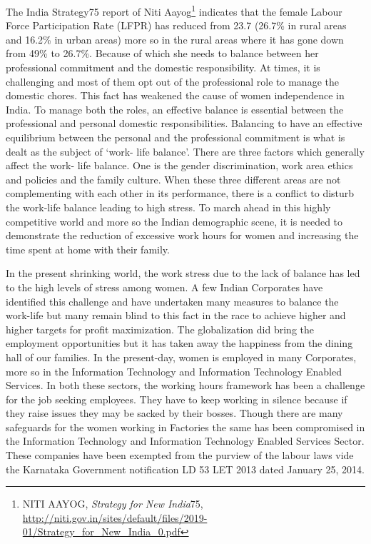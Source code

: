 \begin{multicols}{2}

\noi
The India Strategy\@75 report of Niti Aayog\footnote{NITI AAYOG, \textit{Strategy for New India}\@75, \url{http://niti.gov.in/sites/default/files/2019- 01/Strategy_for_New_India_0.pdf}} indicates that the female Labour Force
Participation Rate (LFPR) has reduced from 23.7 (26.7\% in rural areas and 16.2\% in urban areas) more so in the rural areas where it has gone down from 49\% to 26.7\%. Because of which she needs to balance between her professional commitment and the domestic
responsibility. At times, it is challenging and most of them opt out of the professional role to
manage the domestic chores. This fact has weakened the cause of women independence in
India. To manage both the roles, an effective balance is essential between the professional
and personal domestic responsibilities. Balancing to have an effective equilibrium between
the personal and the professional commitment is what is dealt as the subject of ‘work- life
balance’. There are three factors which generally affect the work- life balance. One is the
gender discrimination, work area ethics and policies and the family culture. When these three
different areas are not complementing with each other in its performance, there is a conflict to
disturb the work-life balance leading to high stress. To march ahead in this highly
competitive world and more so the Indian demographic scene, it is needed to demonstrate the
reduction of excessive work hours for women and increasing the time spent at home with
their family.

\noi
In the present shrinking world, the work stress due to the lack of balance has led to the high
levels of stress among women. A few Indian Corporates have identified this challenge and
have undertaken many measures to balance the work-life but many remain blind to this fact
in the race to achieve higher and higher targets for profit maximization. The globalization did
bring the employment opportunities but it has taken away the happiness from the dining hall
of our families. In the present-day, women is employed in many Corporates, more so in the
Information Technology and Information Technology Enabled Services. In both these
sectors, the working hours framework has been a challenge for the job seeking employees.
They have to keep working in silence because if they raise issues they may be sacked by their
bosses. Though there are many safeguards for the women working in Factories the same has
been compromised in the Information Technology and Information Technology Enabled
Services Sector. These companies have been exempted from the purview of the labour laws
vide the Karnataka Government notification LD 53 LET 2013 dated January 25, 2014.


\end{multicols}
